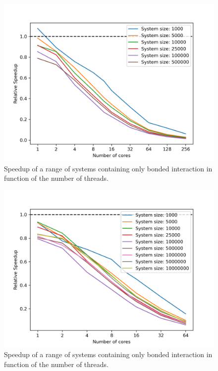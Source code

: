 \documentclass[conference]{IEEEtran}
\begin{document}
    \begin{figure}[H]
        \centering
        \includegraphics[width=\linewidth]{./images/bonds_scaling.png} %
        \caption{Speedup of a range of systems containing only bonded interaction in function of the number 
        of threads.}\label{fig:bonded-speedup}
    \end{figure}
    \begin{figure}[H]
        \centering
        \includegraphics[width=\linewidth]{./images/bonds2_scaling.png} %
        \caption{Speedup of a range of systems containing only bonded interaction in function of the number 
        of threads.}\label{fig:bonded2-speedup}
    \end{figure}
\end{document}
